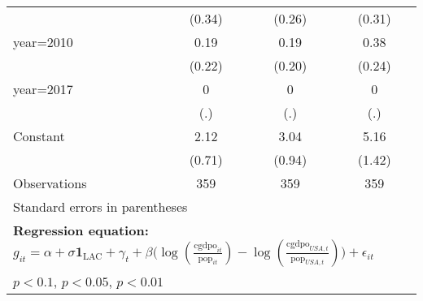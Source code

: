 \begin{sidewaystable}[htbp]
\begin{tabular}{l*{3}{c}}
                &   (0.34)         &   (0.26)         &   (0.31)         \\
\addlinespace
year=2010       &     0.19         &     0.19         &     0.38         \\
                &   (0.22)         &   (0.20)         &   (0.24)         \\
\addlinespace
year=2017       &        0         &        0         &        0         \\
                &      (.)         &      (.)         &      (.)         \\
\addlinespace
Constant        &     2.12\sym{***}&     3.04\sym{***}&     5.16\sym{***}\\
                &   (0.71)         &   (0.94)         &   (1.42)         \\
\midrule
Observations    &      359         &      359         &      359         \\
\bottomrule
\multicolumn{4}{l}{\footnotesize Standard errors in parentheses}\\
\multicolumn{4}{l}{\footnotesize \textbf{Regression equation:} \(g_{it} = \alpha + \sigma \mathbf{1}_{\textrm{LAC}} + \gamma_t + \beta \big(\log (\frac{\textrm{cgdpo}_{it}}{\textrm{pop}_{it}} ) - \log (\frac{\textrm{cgdpo}_{USA,t}}{\textrm{pop}_{USA,t}}  ) \big) + \epsilon_{it}\)}\\
\multicolumn{4}{l}{\footnotesize \sym{*} \(p<0.1\), \sym{**} \(p<0.05\), \sym{***} \(p<0.01\)}\\
\end{tabular}
\end{sidewaystable}
